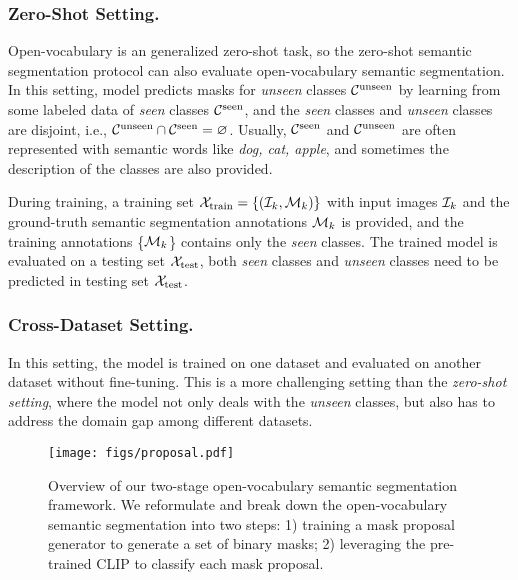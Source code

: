 \documentclass[runningheads]{llncs}
\begin{document}
\subsubsection{Zero-Shot Setting.} Open-vocabulary is an generalized zero-shot task, so the zero-shot semantic segmentation protocol can also evaluate open-vocabulary semantic segmentation. In this setting, model predicts masks for \emph{unseen} classes ${\cal C}^{\text{unseen}}$ by learning from some labeled data of \emph{seen} classes ${\cal C}^{\text{seen}}$, and the \emph{seen} classes and \emph{unseen} classes are disjoint, i.e., ${\cal C}^{\text{unseen}}\cap{\cal C}^{\text{seen}}=\varnothing$. Usually, ${\cal C}^{\text{seen}}$ and ${\cal C}^{\text{unseen}}$ are often represented with semantic words like \textit{dog, cat, apple}, and sometimes the description of the classes are also provided. 

During training, a training set ${\cal X}_{\mathrm{train}}=\left\{ ({\cal I}_{k},{\cal M}_{k})\right\}$ with input images ${\cal I}_{k}$ and the ground-truth semantic segmentation annotations ${\cal M}_{k}$ is provided, and the training annotations \{${\cal M}_{k}$\} contains only the \emph{seen} classes. The trained model is evaluated on a testing set ${\cal X}_{\mathrm{test}}$, both \emph{seen} classes and \emph{unseen} classes need to be predicted in testing set ${\cal X}_{\mathrm{test}}$.

\subsubsection{Cross-Dataset Setting.} 
In this setting, the model is trained on one dataset and evaluated on another dataset without fine-tuning. This is a more challenging setting than the \textit{zero-shot setting}, where the model not only deals with the \emph{unseen} classes, but also has to address the domain gap among different datasets.


\begin{figure*}[t]
  \centering
   \texttt{[image: figs/proposal.pdf]}
   \caption{Overview of our two-stage open-vocabulary semantic segmentation framework. We reformulate and break down the open-vocabulary semantic segmentation into two steps: 1) training a mask proposal generator to generate a set of binary masks; 2) leveraging the pre-trained CLIP to classify each mask proposal. }
   \label{fig:proposal}
   \vspace{-1em}
\end{figure*} 
\end{document}

